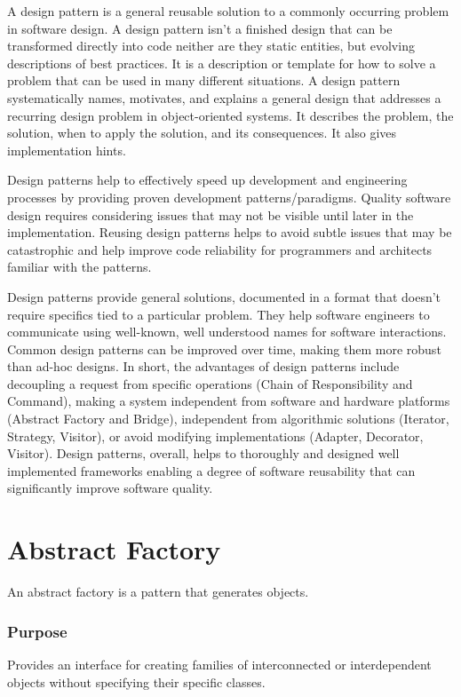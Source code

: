\documentclass[12pt]{book}
\begin{document}
{{A design pattern is a general reusable solution to a commonly occurring  problem in software design. A design pattern isn't a finished design that can be transformed directly into code neither are they static entities, but evolving descriptions of best practices. It is a description or template for how to solve a problem that can be used in many different situations. A design pattern systematically names, motivates, and explains a general design that addresses a recurring design problem in object-oriented systems. It describes the problem, the solution, when to apply the solution, and its consequences. It also gives implementation hints.

Design patterns help to effectively speed up development and engineering processes by providing proven development patterns/paradigms. Quality software design requires considering issues that may not be visible until later in the implementation. Reusing design patterns helps to avoid subtle issues that may be catastrophic and help improve code reliability for programmers and architects familiar with the patterns.

Design patterns provide general solutions, documented in a format that doesn't require specifics tied to a particular problem. They help software engineers to communicate using well-known, well understood names for software interactions. Common design patterns can be improved over time, making them more robust than ad-hoc designs. In short, the advantages of design patterns include decoupling a request from specific operations (Chain of Responsibility and Command), making a system independent from software and hardware platforms (Abstract Factory and Bridge), independent from algorithmic solutions (Iterator, Strategy, Visitor), or avoid modifying implementations (Adapter, Decorator, Visitor). Design patterns, overall, helps to thoroughly and designed well implemented frameworks enabling a degree of software reusability that can significantly improve software quality.


\section{Abstract Factory}
An abstract factory is a pattern that generates objects.

\subsubsection{Purpose}
Provides an interface for creating families of interconnected or interdependent objects without specifying their specific classes.

}}
\end{document}
